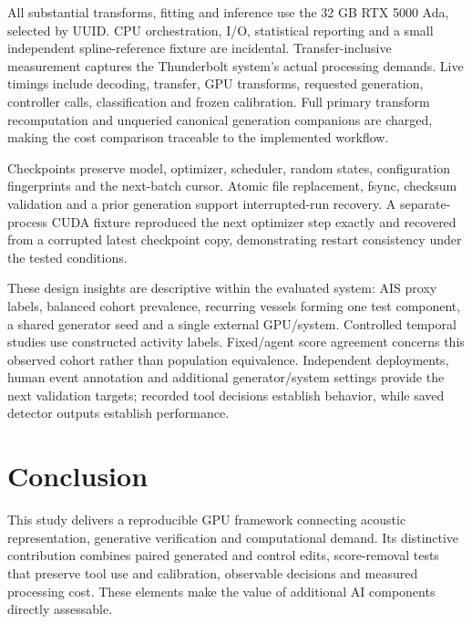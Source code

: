 \documentclass[11pt,letterpaper]{article}
\begin{document}
All substantial transforms, fitting and inference use the 32 GB RTX 5000 Ada, selected by UUID. CPU orchestration, I/O, statistical reporting and a small independent spline-reference fixture are incidental. Transfer-inclusive measurement captures the Thunderbolt system's actual processing demands. Live timings include decoding, transfer, GPU transforms, requested generation, controller calls, classification and frozen calibration. Full primary transform recomputation and unqueried canonical generation companions are charged, making the cost comparison traceable to the implemented workflow.\par

Checkpoints preserve model, optimizer, scheduler, random states, configuration fingerprints and the next-batch cursor. Atomic file replacement, fsync, checksum validation and a prior generation support interrupted-run recovery. A separate-process CUDA fixture reproduced the next optimizer step exactly and recovered from a corrupted latest checkpoint copy, demonstrating restart consistency under the tested conditions.\par

These design insights are descriptive within the evaluated system: AIS proxy labels, balanced cohort prevalence, recurring vessels forming one test component, a shared generator seed and a single external GPU/system. Controlled temporal studies use constructed activity labels. Fixed/agent score agreement concerns this observed cohort rather than population equivalence. Independent deployments, human event annotation and additional generator/system settings provide the next validation targets; recorded tool decisions establish behavior, while saved detector outputs establish performance.\par

\clearpage

\section{Conclusion}

This study delivers a reproducible GPU framework connecting acoustic representation, generative verification and computational demand. Its distinctive contribution combines paired generated and control edits, score-removal tests that preserve tool use and calibration, observable decisions and measured processing cost. These elements make the value of additional AI components directly assessable.\par
\end{document}
